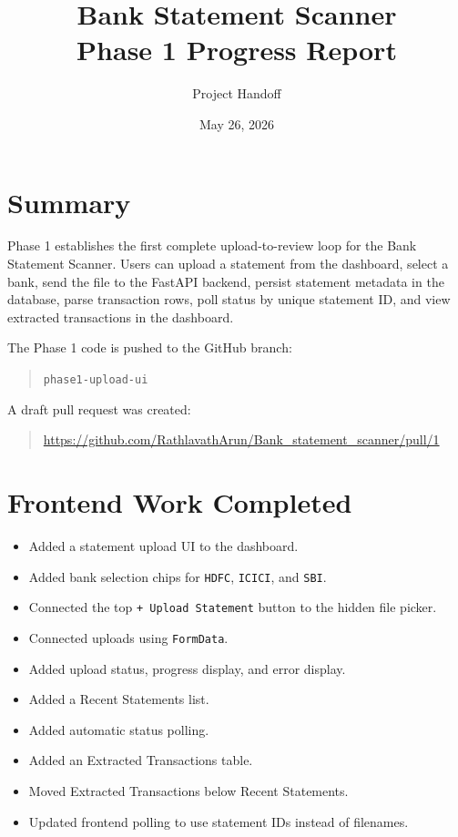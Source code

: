 \documentclass[11pt,a4paper]{article}
\title{Bank Statement Scanner\\Phase 1 Progress Report}
\author{Project Handoff}
\date{May 26, 2026}
\begin{document}
\maketitle

\section{Summary}

Phase 1 establishes the first complete upload-to-review loop for the Bank
Statement Scanner. Users can upload a statement from the dashboard, select a
bank, send the file to the FastAPI backend, persist statement metadata in the
database, parse transaction rows, poll status by unique statement ID, and view
extracted transactions in the dashboard.

The Phase 1 code is pushed to the GitHub branch:
\begin{quote}
\texttt{phase1-upload-ui}
\end{quote}

A draft pull request was created:
\begin{quote}
\url{https://github.com/RathlavathArun/Bank_statement_scanner/pull/1}
\end{quote}

\section{Frontend Work Completed}

\begin{itemize}[leftmargin=*]
  \item Added a statement upload UI to the dashboard.
  \item Added bank selection chips for \texttt{HDFC}, \texttt{ICICI}, and \texttt{SBI}.
  \item Connected the top \texttt{+ Upload Statement} button to the hidden file picker.
  \item Connected uploads using \texttt{FormData}.
  \item Added upload status, progress display, and error display.
  \item Added a Recent Statements list.
  \item Added automatic status polling.
  \item Added an Extracted Transactions table.
  \item Moved Extracted Transactions below Recent Statements.
  \item Updated frontend polling to use statement IDs instead of filenames.
\end{itemize}
\end{document}
